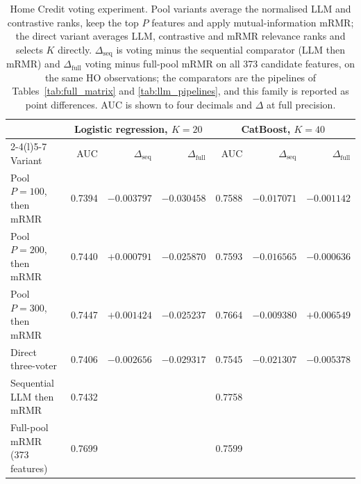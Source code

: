 \documentclass[final,5p,twocolumn]{elsarticle}
\newcommand{\Kfeat}{K}
\begin{document}
\begin{table}[htbp]
\centering
\scriptsize
\setlength{\tabcolsep}{3pt}
\begin{threeparttable}
\caption{Home Credit voting experiment. Pool variants average the normalised LLM and contrastive ranks, keep the top $P$ features and apply mutual-information mRMR; the direct variant averages LLM, contrastive and mRMR relevance ranks and selects $\Kfeat$ directly. $\Delta_{\mathrm{seq}}$ is voting minus the sequential comparator (LLM then mRMR) and $\Delta_{\mathrm{full}}$ voting minus full-pool mRMR on all 373 candidate features, on the same HO observations; the comparators are the pipelines of Tables~\ref{tab:full_matrix} and \ref{tab:llm_pipelines}, and this family is reported as point differences. AUC is shown to four decimals and $\Delta$ at full precision.}
\label{tab:voting}
\begin{tabular}{@{}lrrrrrr@{}}
\toprule
 & \multicolumn{3}{c}{Logistic regression, $\Kfeat=20$} & \multicolumn{3}{c}{CatBoost, $\Kfeat=40$} \\
\cmidrule(lr){2-4}\cmidrule(l){5-7}
Variant & AUC & $\Delta_{\mathrm{seq}}$ & $\Delta_{\mathrm{full}}$ & AUC & $\Delta_{\mathrm{seq}}$ & $\Delta_{\mathrm{full}}$ \\
\midrule
Pool $P=100$, then mRMR & 0.7394 & $-0.003797$ & $-0.030458$ & 0.7588 & $-0.017071$ & $-0.001142$ \\
Pool $P=200$, then mRMR & 0.7440 & $+0.000791$ & $-0.025870$ & 0.7593 & $-0.016565$ & $-0.000636$ \\
Pool $P=300$, then mRMR & 0.7447 & $+0.001424$ & $-0.025237$ & 0.7664 & $-0.009380$ & $+0.006549$ \\
Direct three-voter & 0.7406 & $-0.002656$ & $-0.029317$ & 0.7545 & $-0.021307$ & $-0.005378$ \\
\midrule
Sequential LLM then mRMR & 0.7432 & & & 0.7758 & & \\
Full-pool mRMR (373 features) & 0.7699 & & & 0.7599 & & \\
\bottomrule
\end{tabular}
\end{threeparttable}
\end{table}
\end{document}

